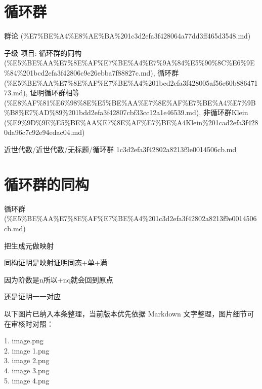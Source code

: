 \section*{循环群}

\begin{note}[来源上级主题]

群论 (\%E7\%BE\%A4\%E8\%AE\%BA\%201c3d2efa3f428064a77dd3ff465d3548.md)

\end{note}

\begin{note}[循环群]

子级 项目: 循环群的同构 (\%E5\%BE\%AA\%E7\%8E\%AF\%E7\%BE\%A4\%E7\%9A\%84\%E5\%90\%8C\%E6\%9E\%84\%201bcd2efa3f42806c9e26ebba7f88827c.md), 循环群 (\%E5\%BE\%AA\%E7\%8E\%AF\%E7\%BE\%A4\%201bcd2efa3f428005af56c60b88647173.md), 证明循环群相等 (\%E8\%AF\%81\%E6\%98\%8E\%E5\%BE\%AA\%E7\%8E\%AF\%E7\%BE\%A4\%E7\%9B\%B8\%E7\%AD\%89\%201bdd2efa3f42807cbf33cc12a1e46539.md), 非循环群Klein (\%E9\%9D\%9E\%E5\%BE\%AA\%E7\%8E\%AF\%E7\%BE\%A4Klein\%201cad2efa3f4280da96c7c92e94edac04.md)

\end{note}

\begin{note}[来源路径]

近世代数/近世代数/无标题/循环群 1c3d2efa3f42802a8213f9e0014506cb.md

\end{note}

\section*{循环群的同构}

\begin{note}[来源上级主题]

循环群 (\%E5\%BE\%AA\%E7\%8E\%AF\%E7\%BE\%A4\%201c3d2efa3f42802a8213f9e0014506cb.md)

\end{note}

\begin{note}[循环群的同构]

把生成元做映射

同构证明是映射证明同态+单+满

因为阶数是n所以+nq就会回到原点

还是证明一一对应

\end{note}

\begin{note}[关联图片]
以下图片已纳入本条整理，当前版本优先依据 Markdown 文字整理，图片细节可在审核时对照：

1. image.png\\
2. image 1.png\\
3. image 2.png\\
4. image 3.png\\
5. image 4.png\\

\end{note}

